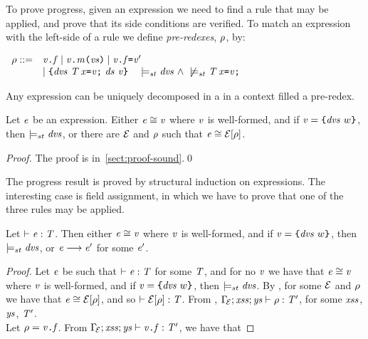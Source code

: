 {To prove progress, given an expression we need to find a rule that may be applied, and prove that 
its side conditions are verified. To match an expression with the left-side of a rule we define
 {\em pre-redexes}, ${\rho}$, by:
\begin{center}
$
\begin{array}{ll}
\preRedex ::=& \FieldAccess{\val}{\f}\mid\MethCall{{\val}}{\m}{{\vals}}\mid\FieldAssign{\val}{\f}{\val'}
  \\
 &
 \mid \Block{\dvs\ \Dec{\T}{\x}{\val}\ \decs}{\val}\quad\WFdv{\dvs}\ \wedge\ \not\WFdv{\Dec{\T}{\x}{\val}}\\
\end{array}
$
\end{center}
Any expression can be uniquely decomposed in a in a context filled a pre-redex.
\begin{lemma}\label{lemma:decomposition}
Let $\mathit{e}$ be an expression. Either ${\mathit{e}}\cong{\mathit{v}}$ where $\mathit{v}$ is well-formed,
and if $\mathit{v}=\texttt{\{}\mathit{dvs}\ w\texttt{\}}$, then $\models_{st}\mathit{dvs}$,
or there are ${\cal{E}}$ and ${\rho}$ such that ${\mathit{e}}\cong{{\cal{E}}[{\rho}]}$.
\end{lemma}
\begin{proof}
The proof is in~\ref{sect:proof-sound}.\qed
\end{proof}
The progress result is proved by structural induction on expressions. The interesting case
is field assignment, in which we have to prove that one of the three rules may be applied. 
\begin{theorem}[Progress]\label{theo:progress}
Let $\vdash \mathit{e}:\mathit{T}$. Then either ${\mathit{e}}\cong{\mathit{v}}$ where $\mathit{v}$ is well-formed,
and if $\mathit{v}=\texttt{\{}\mathit{dvs}\ w\texttt{\}}$, then  $\models_{st}\mathit{dvs}$, or $\mathit{e}\longrightarrow\mathit{e}'$ for some $\mathit{e}'$.
\end{theorem}
\begin{proof}
Let $\mathit{e}$ be such that $\vdash \mathit{e}:\mathit{T}$
for some $\mathit{T}$, and for no $\mathit{v}$ we have that
${\mathit{e}}\cong{\mathit{v}}$ where $\mathit{v}$ is well-formed,
and if $\mathit{v}=\texttt{\{}\mathit{dvs}\ w\texttt{\}}$, then $\models_{st}\mathit{dvs}$.
By , for some ${\cal{E}}$ and ${\rho}$
we have that ${\mathit{e}}\cong{{\cal{E}}[{\rho}]}$, and so
$\vdash {\cal{E}}[{\rho}]:\mathit{T}$.
From , 
${\Gamma_{\!{\cal{E}}}};\mathit{xss};\mathit{ys}\vdash {{\rho}}:\mathit{T}'$,
for some $\mathit{xss}$, $\mathit{ys}$,
$\mathit{T}'$. \\
Let \underline{${\rho}=\mathit{v}\texttt{.}\mathit{f}$}. 
From $\Gamma_{\!{\cal{E}}};\mathit{xss};\mathit{ys}\vdash \mathit{v}\texttt{.}\mathit{f}:\mathit{T}'$, we have that 

\end{proof}}
